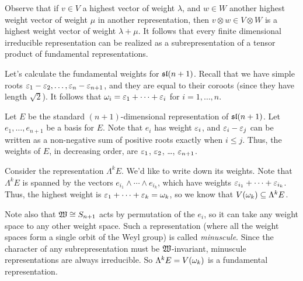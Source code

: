 Observe that if $v\in V$ a highest vector of weight $\lambda$, and $w\in W$ another
 highest weight vector of weight $\mu$ in another representation, then $v\otimes w\in
 V\otimes W$ is a highest weight vector of weight $\lambda+\mu$. It follows that every
 finite dimensional irreducible representation can be realized as a subrepresentation
 of a tensor product of fundamental representations.
 \begin{example}\label{lec19Eg:Fund_sl(n+1)}
   Let's calculate the fundamental weights for $\sl(n+1)$. Recall that we have simple
   roots $\e_1-\e_2, \dots, \e_n-\e_{n+1}$, and they are equal to their coroots (since
   they have length $\sqrt 2$). It follows that $\w_i=\e_1+\cdots +\e_i$ for
   $i=1,\dots, n$.

   Let $E$ be the standard $(n+1)$-dimensional representation of $\sl(n+1)$. Let
   $e_1,\dots, e_{n+1}$ be a basis for $E$. Note that $e_i$ has weight $\e_i$, and
   $\e_i-\e_j$ can be written as a non-negative sum of positive roots exactly when
   $i\le j$. Thus, the weights of $E$, in decreasing order, are $\e_1$, $\e_2$, \dots,
   $\e_{n+1}$.

   Consider the representation $\Lambda^k E$. We'd like to write down its weights.
   Note that $\Lambda^k E$ is spanned by the vectors $e_{i_1}\wedge \cdots \wedge
   e_{i_k}$, which have weights $\e_{i_1}+\cdots +\e_{i_k}$. Thus, the highest weight
   is $\e_1+\cdots + \e_k=\w_k$, so we know that $V(\w_k)\subseteq \Lambda^k E$.

   Note also that $\weyl \cong S_{n+1}$ acts by permutation of the $e_i$, so it can
   take any weight space to any other weight space. Such a representation (where all
   the weight spaces form a single orbit of the Weyl group) is called
   \emph{minuscule}. Since the character of any
   subrepresentation must be $\weyl$-invariant, minuscule representations are always
   irreducible. So $\Lambda^k E= V(\w_k)$ is a fundamental representation.
 \end{example}
